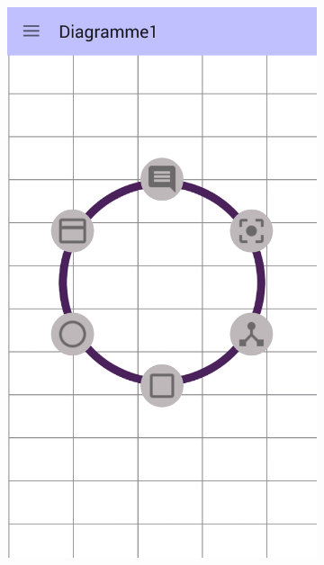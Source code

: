 \begin{itemize}
\newpage
		\begin{figure}[!h]
			\centering
			\begin{subfigure}[t]{.27\textwidth}
				\includegraphics[width=\textwidth]{img/screen/new/colladia_draw_view_menu_contextuel_main}
			\end{subfigure}
			~
			\begin{subfigure}[t]{.27\textwidth}

\end{subfigure}
\end{figure}
\end{itemize}
